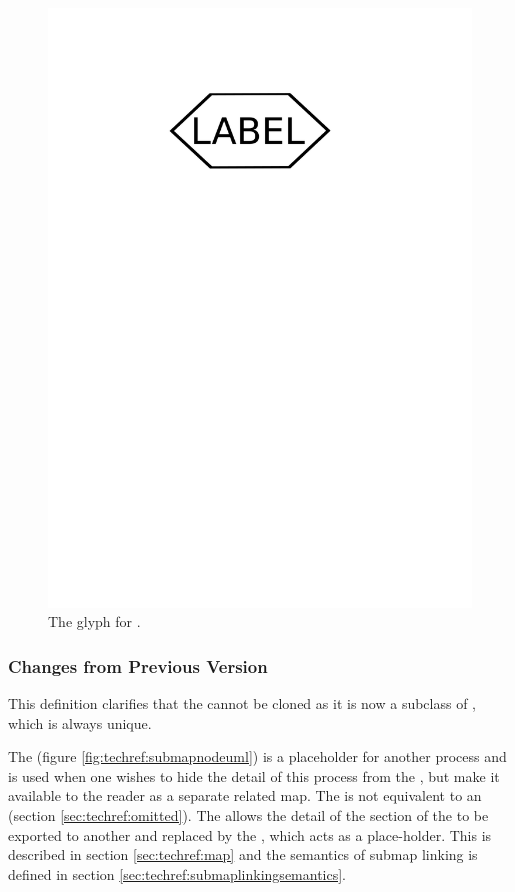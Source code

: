 \begin{figure}[htb]
  \centering
  \includegraphics[scale = 0.3]{images/phenotype}
  \caption{The \PD glyph for .}
  \label{fig:techref:phenotype}
\end{figure}


\subsubsection{Changes from Previous Version}

This definition clarifies that the  cannot be
cloned as it is now a subclass of , which is always
unique.


\label{sec:techref:submap}\label{defn:SubmapNode}

The  (figure \ref{fig:techref:submapnodeuml}) is a
placeholder for another process and is used when one wishes to hide
the detail of this process from the \PDm, but make it available to the
reader as a separate related map. The  is not
equivalent to an  (section
\ref{sec:techref:omitted}). The  allows the detail of
the section of the \PDm to be exported to another \PDm and replaced by the
, which acts as a place-holder.  This is
described in section \ref{sec:techref:map} and the semantics of submap linking
is defined in section \ref{sec:techref:submaplinkingsemantics}.


